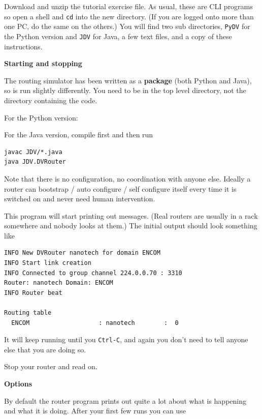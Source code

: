 
Download and unzip the tutorial exercise file. As usual, these
are CLI programs so open a shell and \texttt{cd} into the new
directory. (If you are logged onto more than one PC, do the
same on the others.) You will find two sub directories,
\texttt{PyDV} for the Python version and \texttt{JDV} for Java,
a few text files, and a copy of these instructions.

\textbf{Starting and stopping}

The routing simulator has been written as a \textbf{package}
(both Python and Java), so is run slightly differently.
You need to be in the top level directory, not the directory
containing the code.

For the Python version:

For the Java version, compile first and then run
\begin{CODE}\begin{verbatim}
javac JDV/*.java
java JDV.DVRouter
\end{verbatim}\end{CODE}

Note that there is no configuration, no coordination with anyone
else. Ideally a router can bootstrap / auto configure / self
configure itself every time it is switched on and never need
human intervention.

This program will start printing out messages. (Real routers
are usually in a rack somewhere and nobody looks at them.)
The initial output should look something like

\begin{CODE}\begin{verbatim}
INFO New DVRouter nanotech for domain ENCOM
INFO Start link creation
INFO Connected to group channel 224.0.0.70 : 3310
Router: nanotech Domain: ENCOM
INFO Router beat

Routing table
  ENCOM                   : nanotech        :  0
\end{verbatim}\end{CODE}

It will keep running until you \texttt{Ctrl-C}, and again you
don't need to tell anyone else that you are doing so.

Stop your router and read on.

\textbf{Options}

By default the router program prints out quite a lot about
what is happening and what it is doing. After your first
few runs you can use


